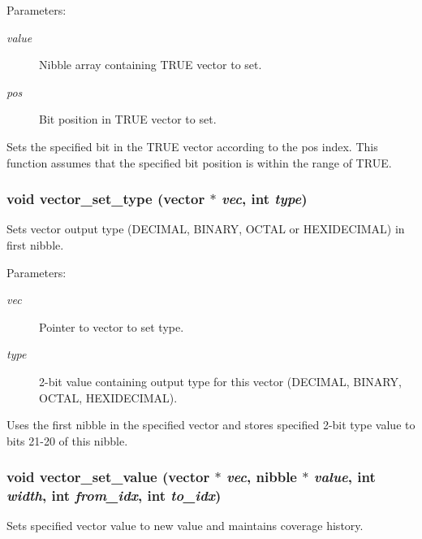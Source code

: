 \begin{Desc}
\item[Parameters:]
\begin{description}
\item[{\em value}]Nibble array containing TRUE vector to set. \item[{\em pos}]Bit position in TRUE vector to set.\end{description}
\end{Desc}
Sets the specified bit in the TRUE vector according to the pos index. This function assumes that the specified bit position is within the range of TRUE. 
\subsubsection{\setlength{\rightskip}{0pt plus 5cm}void vector\_\-set\_\-type ({\bf vector} $\ast$ {\em vec}, int {\em type})}\label{vector_8c_a27}


Sets vector output type (DECIMAL, BINARY, OCTAL or HEXIDECIMAL) in first nibble. 

\begin{Desc}
\item[Parameters:]
\begin{description}
\item[{\em vec}]Pointer to vector to set type. \item[{\em type}]2-bit value containing output type for this vector (DECIMAL, BINARY, OCTAL, HEXIDECIMAL).\end{description}
\end{Desc}
Uses the first nibble in the specified vector and stores specified 2-bit type value to bits 21-20 of this nibble. 
\subsubsection{\setlength{\rightskip}{0pt plus 5cm}void vector\_\-set\_\-value ({\bf vector} $\ast$ {\em vec}, {\bf nibble} $\ast$ {\em value}, int {\em width}, int {\em from\_\-idx}, int {\em to\_\-idx})}\label{vector_8c_a26}


Sets specified vector value to new value and maintains coverage history. 

